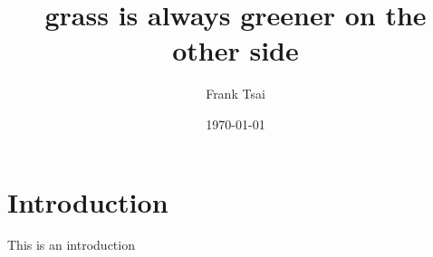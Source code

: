 \documentclass[article,10pt,oneside]{memoir}
\title{grass is always greener on the other side}
\author{Frank Tsai}
\date{\today}
\begin{document}
\maketitle
\tableofcontents

\section{Introduction}
\label{sec:introduction}

This is an introduction



\end{document}
